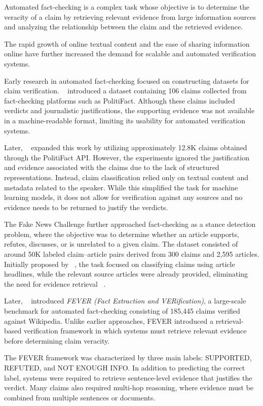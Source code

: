 Automated fact-checking is a complex task whose objective is to determine the veracity of a claim by retrieving relevant evidence from large information sources and analyzing the relationship between the claim and the retrieved evidence.

The rapid growth of online textual content and the ease of sharing information online have further increased the demand for scalable and automated verification systems.

Early research in automated fact-checking focused on constructing datasets for claim verification. ~\citet{Vlachos2014Jun} introduced a dataset containing 106 claims collected from fact-checking platforms such as PolitiFact. Although these claims included verdicts and journalistic justifications, the supporting evidence was not available in a machine-readable format, limiting its usability for automated verification systems.

Later, ~\citet{Wang2017Jul} expanded this work by utilizing approximately 12.8K claims obtained through the PolitiFact API. However, the experiments ignored the justification and evidence associated with the claims due to the lack of structured representations. Instead, claim classification relied only on textual content and metadata related to the speaker. While this simplified the task for machine learning models, it does not allow for verification against any sources and no evidence needs to be returned to justify the verdicts.

The Fake News Challenge further approached fact-checking as a stance detection problem, where the objective was to determine whether an article supports, refutes, discusses, or is unrelated to a given claim. The dataset consisted of around 50K labeled claim–article pairs derived from 300 claims and 2,595 articles. Initially proposed by ~\citet{Ferreira2016Jun}, the task focused on classifying claims using article headlines, while the relevant source articles were already provided, eliminating the need for evidence retrieval ~\cite{PomerleauDelip2017Jun}.

Later, ~\citet{Thorne2018Jun} introduced \textit{FEVER (Fact Extraction and VERification)}, a large-scale benchmark for automated fact-checking consisting of 185,445 claims verified against Wikipedia. Unlike earlier approaches, FEVER introduced a retrieval-based verification framework in which systems must retrieve relevant evidence before determining claim veracity.

The FEVER framework was characterized by three main labels: SUPPORTED, REFUTED, and NOT ENOUGH INFO. In addition to predicting the correct label, systems were required to retrieve sentence-level evidence that justifies the verdict. Many claims also required multi-hop reasoning, where evidence must be combined from multiple sentences or documents.

